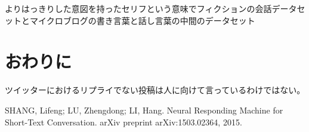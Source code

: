 \documentclass{deimj}
\begin{document}
よりはっきりした意図を持ったセリフという意味でフィクションの会話データセットとマイクロブログの書き言葉と話し言葉の中間のデータセット


\section{おわりに}
\label{sec:conclusion}

ツイッターにおけるリプライでない投稿は人に向けて言っているわけではない。

\vspace{2em}

\begin{thebibliography}{99}
  SHANG, Lifeng; LU, Zhengdong; LI, Hang.
  Neural Responding Machine for Short-Text Conversation.
  arXiv preprint arXiv:1503.02364, 2015.
\end{thebibliography}
\end{document}
